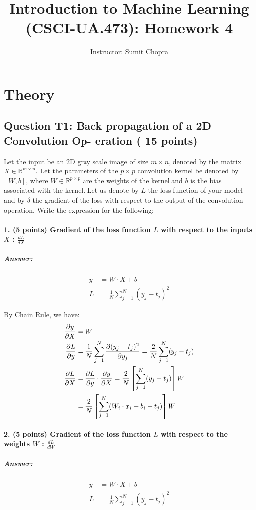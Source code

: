 \documentclass[10pt]{article}
\title{Introduction to Machine Learning (CSCI-UA.473): Homework 4 }
\author{Instructor: Sumit Chopra}
\date{}
\begin{document}
\maketitle

\section*{Theory}
\subsection*{Question T1: Back propagation of a 2D Convolution Op- eration ( 15 points)}
Let the input be an $2 \mathrm{D}$ gray scale image of size $m \times n$, denoted by the matrix $X \in \mathbb{R}^{m \times n}$. Let the parameters of the $p \times p$ convolution kernel be denoted by $[W, b]$, where $W \in \mathbb{R}^{p \times p}$ are the weights of the kernel and $b$ is the bias associated with the kernel. Let us denote by $L$ the loss function of your model and by $\delta$ the gradient of the loss with respect to the output of the convolution operation. Write the expression for the following:

\paragraph{1. (5 points) Gradient of the loss function $L$ with respect to the inputs $X$ : $\frac{d L}{d X}$}
\subparagraph{Answer: }

\begin{align*}
  y &=W\cdot X+b\\
  L &= \frac{1}{N}\sum_{j=1}^{N}(y_j-t_j)^2
\end{align*}

By Chain Rule, we have:
\begin{align*}
  \pdv{y}{X}&=W\\
  \pdv{L}{y}&=\frac{1}{N}\sum_{j=1}^{N}\pdv{(y_j-t_j)^2}{y_j} =\frac{2}{N}\sum_{j=1}^{N}(y_j-t_j)\\
  \pdv{L} {X}&= \pdv{L}{y}\cdot \pdv{y}{X} =\frac{2}{N}\left[\sum_{j=1}^{N}(y_j-t_j)\right]W\\
  &=\frac{2}{N}\left[\sum_{j=1}^{N}(W_i\cdot x_i + b_i-t_j)\right]W
\end{align*}



\paragraph{2. (5 points) Gradient of the loss function $L$ with respect to the weights $W$ : $\frac{d L}{d W}$}
\subparagraph{Answer: }
\begin{align*}
  y &=W\cdot X+b\\
  L &= \frac{1}{N}\sum_{j=1}^{N}(y_j-t_j)^2
\end{align*}
\end{document}
